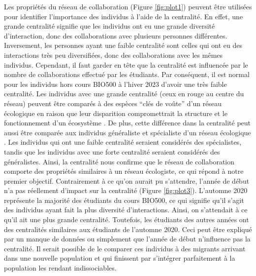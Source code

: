 \documentclass[preprint, 3p,
authoryear]{elsarticle} %
\begin{document}
Les propriétés du réseau de collaboration (Figure \ref{fig:plot1})
peuvent être utilisées pour identifier l'importance des individus à
l'aide de la centralité. En effet, une grande centralité signifie que
les individus ont eu une grande diversité d'interaction, donc des
collaborations avec plusieurs personnes différentes. Inversement, les
personnes ayant une faible centralité sont celles qui ont eu des
interactions très peu diversifiées, donc des collaborations avec les
mêmes individus. Cependant, il faut garder en tête que la centralité est
influencée par le nombre de collaborations effectué par les étudiants.
Par conséquent, il est normal pour les individus hors cours BIO500 à
l'hiver 2023 d'avoir une très faible centralité. Les individus avec une
grande centralité (ceux en rouge au centre du réseau) peuvent être
comparés à des espèces ``clés de voûte'' d'un réseau écologique en
raison que leur disparition compromettrait la structure et le
fonctionnement d'un écosystème \citep{cagua2019keystoneness}. De plus,
cette différence dans la centralité peut aussi être comparée aux
individus généraliste et spécialiste d'un réseau écologique
\citep{cagua2019keystoneness}. Les individus qui ont une faible
centralité seraient considérés des spécialistes, tandis que les
individus avec une forte centralité seraient considérés des
généralistes. Ainsi, la centralité nous confirme que le réseau de
collaboration comporte des propriétés similaires à un réseau écologiste,
ce qui répond à notre premier objectif. Contrairement à ce qu'on aurait
pu s'attendre, l'année de début n'a pas réellement d'impact sur la
centralité (Figure \ref{fig:plot3}). L'automne 2020 représente la
majorité des étudiants du cours BIO500, ce qui signifie qu'il s'agit des
individus ayant fait la plus diversité d'interactions. Ainsi, on
s'attendait à ce qu'il ait une plus grande centralité. Toutefois, les
étudiants des autres années ont des centralités similaires aux étudiants
de l'automne 2020. Ceci peut être expliqué par un manque de données ou
simplement que l'année de début n'influence pas la centralité. Il serait
possible de le comparer ces individus à des migrants arrivant dans une
nouvelle population et qui finissent par s'intégrer parfaitement à la
population les rendant indissociables.
\end{document}
